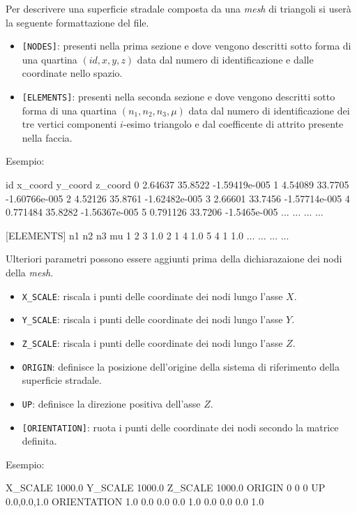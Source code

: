 Per descrivere una superficie stradale composta da una \textit{mesh} di triangoli si userà la seguente formattazione del file.
\begin{itemize}
	\item \texttt{[NODES]}: presenti nella prima sezione e dove vengono descritti sotto forma di una quartina $(id,x,y,z)$ data dal numero di identificazione e dalle coordinate nello spazio.
	\item \texttt{[ELEMENTS]}: presenti nella seconda sezione e dove vengono descritti sotto forma di una quartina $(n_1,n_2,n_3,\mu)$ data dal numero di identificazione dei tre vertici componenti $i$-esimo triangolo e dal coefficente di attrito presente nella faccia.
\end{itemize}
Esempio:
\begin{pseudoc}
	[NODES]
	{ id x_coord y_coord z_coord }
	0 2.64637 35.8522 -1.59419e-005 
	1 4.54089 33.7705 -1.60766e-005 
	2 4.52126 35.8761 -1.62482e-005 
	3 2.66601 33.7456 -1.57714e-005 
	4 0.771484 35.8282 -1.56367e-005 
	5 0.791126 33.7206 -1.5465e-005
	... ... ... ...
	
	[ELEMENTS]
	{ n1 n2 n3 mu }
	1 2 3 1.0 
	2 1 4 1.0 
	5 4 1 1.0 
	... ... ... ...
\end{pseudoc}

Ulteriori parametri possono essere aggiunti prima della dichiarazaione dei nodi della \textit{mesh}.
\begin{itemize}
	\item \texttt{X\_SCALE}: riscala i punti delle coordinate dei nodi lungo l'asse $X$.
	\item \texttt{Y\_SCALE}: riscala i punti delle coordinate dei nodi lungo l'asse $Y$.
	\item \texttt{Z\_SCALE}: riscala i punti delle coordinate dei nodi lungo l'asse $Z$.
	\item \texttt{ORIGIN}: definisce la posizione dell'origine della sistema di riferimento della superficie stradale.
	\item \texttt{UP}: definisce la direzione positiva dell'asse $Z$.
	\item \texttt{[ORIENTATION]}: ruota i punti delle coordinate dei nodi secondo la matrice definita.
\end{itemize}
Esempio:
\begin{pseudoc}
	X_SCALE
	1000.0
	Y_SCALE
	1000.0
	Z_SCALE
	1000.0
	ORIGIN
	0 0 0
	UP
	0.0,0.0,1.0
	ORIENTATION
	1.0  0.0  0.0
	0.0  1.0  0.0
	0.0  0.0  1.0
\end{pseudoc}
